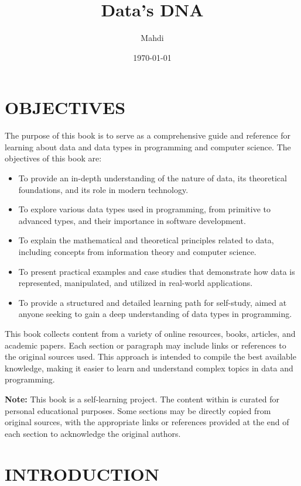 \documentclass[12pt, oneside]{book}
\title{{\Huge Data's DNA}}
\author{{\LARGE Mahdi}}
\date{{\large \today}}
\begin{document}
	\frontmatter
	\mainmatter
	\maketitle
	\tableofcontents
\chapter{OBJECTIVES}

The purpose of this book is to serve as a comprehensive guide and reference for learning about data and data types in programming and computer science. The objectives of this book are:

\begin{itemize}
	\item To provide an in-depth understanding of the nature of data, its theoretical foundations, and its role in modern technology.
	\item To explore various data types used in programming, from primitive to advanced types, and their importance in software development.
	\item To explain the mathematical and theoretical principles related to data, including concepts from information theory and computer science.
	\item To present practical examples and case studies that demonstrate how data is represented, manipulated, and utilized in real-world applications.
	\item To provide a structured and detailed learning path for self-study, aimed at anyone seeking to gain a deep understanding of data types in programming.
\end{itemize}

This book collects content from a variety of online resources, books, articles, and academic papers. Each section or paragraph may include links or references to the original sources used. This approach is intended to compile the best available knowledge, making it easier to learn and understand complex topics in data and programming.

\vspace{0.5cm}
\textbf{Note:} This book is a self-learning project. The content within is curated for personal educational purposes. Some sections may be directly copied from original sources, with the appropriate links or references provided at the end of each section to acknowledge the original authors.

\chapter{INTRODUCTION}
\end{document}
